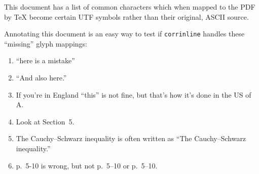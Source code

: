 \documentclass{amsart}
\begin{document}
This document has a list of common characters which when mapped to the PDF by \TeX{} become certain
UTF symbols rather than their original, ASCII source.

Annotating this document is an easy way to test if {\tt corrinline} handles these ``missing'' glyph %
mappings:

\begin{enumerate}[(1)]

\item ``here is %
a mistake''

\item ``And %
also here.''

\item If you're in England ``this'' is not fine, but that's how it's done in the US of A. 

\item Look at Section~5.

\item The %
Cauchy--Schwarz inequality is often written as %
``The Cauchy--Schwarz inequality.'' %

\item %
p.~5-10 is wrong, but not p.~5--10 or %
p.~5--10.


\end{enumerate}
\end{document}
